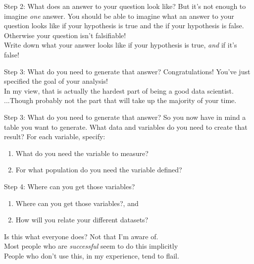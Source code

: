 \documentclass[11pt]{beamer}
\begin{document}
\begin{frame}[c]{Step 2: What does \alert{an answer} to your question look like?}
But it's not enough to imagine \emph{one} answer. You should be able to imagine what an answer to your question looks like if your hypothesis \alert{is true} and the if your hypothesis \alert{is false}. \\
\pause Otherwise your question isn't falsifiable! \\
\vspace*{0.3cm}
Write down what your answer looks like if your hypothesis is true, \emph{and} if it's false!
\end{frame}

\begin{frame}[c]{Step 3: What do you need to generate that answer?}
  Congratulations! You've just specified the goal of your analysis! \\
  \pause In my view, that is actually the hardest part of being a good data scientist. \\
  \pause ...Though probably not the part that will take up the majority of your time.
\end{frame}

\begin{frame}[c]{Step 3: What do you need to generate that answer?}
  So you now have in mind a table you want to generate. What data and variables do you need to create that result?
  \pause
  \pause For each variable, specify:
  \begin{enumerate}
    \item What do you need the variable to measure?
    \item For what population do you need the variable defined?
  \end{enumerate}
\end{frame}

\begin{frame}[c]{Step 4: Where can you get those variables?}
  \begin{enumerate}
    \item Where can you get those variables?, and
    \item How will you relate your different datasets?
  \end{enumerate}
\end{frame}

\begin{frame}[c]{Is this what everyone does?}
  \pause Not that I'm aware of. \\
  \pause Most people who are \emph{successful} seem to do this implicitly \\
  \pause People who don't use this, in my experience, tend to flail.
\end{frame}
\end{document}

